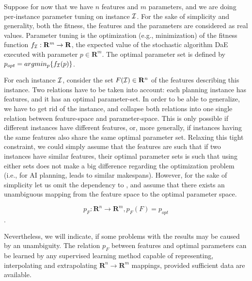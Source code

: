 \documentclass{MYsig-alternate}
\begin{document}
Suppose for now that we have $n$ features and $m$ parameters, and we are doing per-instance parameter tuning on instance $\cal I$. For the sake of simplicity and generality, both the fitness, the features and the parameters are considered as real values. Parameter tuning is the optimization (e.g., minimization) of the fitness function \begin{math}f_{\cal I}:\mathbf{R}^m\to \mathbf{R} \end{math}, the expected value of the stochastic algorithm DaE executed with parameter \begin{math} p \in \mathbf{R}^m \end{math}. The optimal parameter set is defined by \begin{math} p_{opt}=argmin_p\{f_{\cal I}(p)\} \end{math}. 

For each instance $\cal I$, consider the set \begin{math} F({\cal I}) \in \mathbf{R}^n \end{math} of the features describing this instance. 
Two relations have to be taken into account: each planning instance has features, and it has an optimal parameter-set. In order to be able to generalize, we have to get rid of the instance, and collapse both relations into one single relation between feature-space and parameter-space. This is only possible if different instances have different features, or, more generally, if instances having the same features also share the same optimal parameter set. Relaxing this tight constraint, we could simply assume that the features are such that if two instances have similar features, their optimal parameter sets is such that using either sets does not make a big difference regarding the optimization problem (i.e., for AI planning, leads to similar makespans). However, for the sake of simplicity let us omit the dependency to , and assume that there exists an unambiguous mapping from the feature space to the optimal parameter space. 

\begin{equation} p_F: \mathbf{R}^n \to \mathbf{R}^m, p_F(F)=p_{opt} \end{equation}.	

Nevertheless, we will indicate, if some problems with the results may be caused by an unambiguity. The relation \begin{math} p_F \end{math} between features and optimal parameters can be learned by any supervised learning method capable of representing, interpolating and extrapolating  \begin{math}\mathbf{R}^n\to \mathbf{R}^m \end{math} mappings, provided sufficient data are available.
\end{document}
